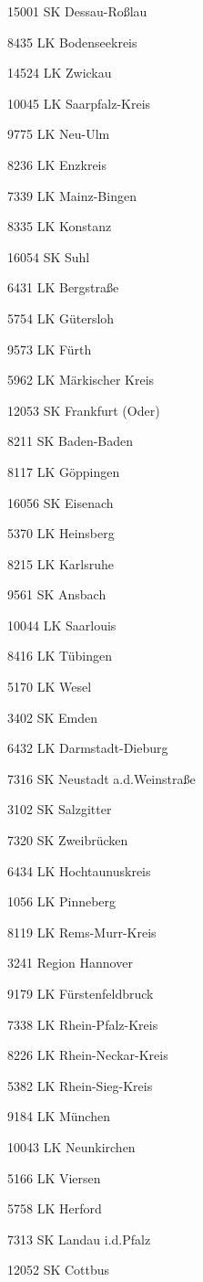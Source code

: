 15001  SK Dessau-Roßlau

8435  LK Bodenseekreis

14524  LK Zwickau

10045  LK Saarpfalz-Kreis

9775  LK Neu-Ulm

8236  LK Enzkreis

7339  LK Mainz-Bingen

8335  LK Konstanz

16054  SK Suhl

6431  LK Bergstraße

5754  LK Gütersloh

9573  LK Fürth

5962  LK Märkischer Kreis

12053  SK Frankfurt (Oder)

8211  SK Baden-Baden

8117  LK Göppingen

16056  SK Eisenach

5370  LK Heinsberg

8215  LK Karlsruhe

9561  SK Ansbach

10044  LK Saarlouis

8416  LK Tübingen

5170  LK Wesel

3402  SK Emden

6432  LK Darmstadt-Dieburg

7316  SK Neustadt a.d.Weinstraße

3102  SK Salzgitter

7320  SK Zweibrücken

6434  LK Hochtaunuskreis

1056  LK Pinneberg

8119  LK Rems-Murr-Kreis

3241  Region Hannover

9179  LK Fürstenfeldbruck

7338  LK Rhein-Pfalz-Kreis

8226  LK Rhein-Neckar-Kreis

5382  LK Rhein-Sieg-Kreis

9184  LK München

10043  LK Neunkirchen

5166  LK Viersen

5758  LK Herford

7313  SK Landau i.d.Pfalz

12052  SK Cottbus

